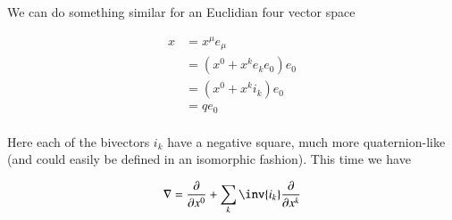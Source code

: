 \documentclass{article}
\begin{document}
We can do something similar for an Euclidian four vector space

\begin{align*}
x 
&= x^\mu e_\mu \\
&= \left( x^0 + x^k e_k e_0 \right) e_0 \\
&= \left( x^0 + x^k i_k \right) e_0 \\
&= q e_0 \\
\end{align*}

Here each of the bivectors $i_k$ have a negative square, much more quaternion-like (and could easily be defined in an
isomorphic fashion).  This time we have

\begin{align*}
\grad 
&= \PD{x^0}{} + \sum_k \inv{i_k} \PD{x^k}{} \\
\end{align*}



\end{document}
